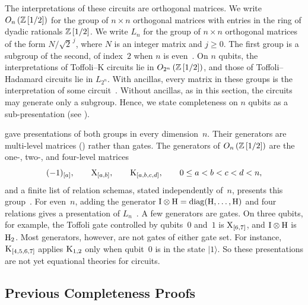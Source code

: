 \documentclass[acmsmall,screen,nonacm]{acmart}
\begin{document}
The interpretations of these circuits are orthogonal matrices. We write $O_n\left(\mathbb{Z}\left[1/2\right]\right)$ for the group of $n\times n$ orthogonal matrices with entries in the ring of dyadic rationals $\mathbb{Z}\left[1/2\right]$. We write $L_n$ for the group of $n\times n$ orthogonal matrices of the form $N/\sqrt2^{\,j}$, where $N$ is an integer matrix and $j\ge0$. The first group is a subgroup of the second, of index~$2$ when $n$ is even~\cite{li2021on}. On $n$ qubits, the interpretations of Toffoli--K circuits lie in $O_{2^n}\left(\mathbb{Z}\left[1/2\right]\right)$, and those of Toffoli--Hadamard circuits lie in $L_{2^n}$. With ancillas, every matrix in these groups is the interpretation of some circuit~\cite{amy2020numbertheoretic}. Without ancillas, as in this section, the circuits may generate only a subgroup. Hence, we state completeness on $n$ qubits as a sub-presentation (see ).

\citet{li2021on} gave presentations of both groups in every dimension~$n$. Their generators are multi-level matrices () rather than gates. The generators of $O_n\left(\mathbb{Z}\left[1/2\right]\right)$ are the one-, two-, and four-level matrices
\[
(-1)_{[a]}, \qquad \mathrm{X}_{[a,b]}, \qquad \mathrm{K}_{[a,b,c,d]}, \qquad 0\le a<b<c<d<n,
\]
and a finite list of relation schemas, stated independently of~$n$, presents this group~\cite[Theorem~4.10]{li2021on}. For even~$n$, adding the generator $\mathrm{I}\otimes\mathrm{H} = \mathrm{diag}(\mathrm{H},\dots,\mathrm{H})$ and four relations gives a presentation of $L_n$~\cite[Theorem~5.7]{li2021on}. A few generators are gates. On three qubits, for example, the Toffoli gate controlled by qubits~$0$ and~$1$ is $\mathrm{X}_{[6,7]}$, and $\mathrm{I}\otimes\mathrm{H}$ is $\mathrm{H}_2$. Most generators, however, are not gates of either gate set. For instance, $\mathrm{K}_{[4,5,6,7]}$ applies $\mathrm{K}_{1,2}$ only when qubit~$0$ is in the state $\lvert 1\rangle$. So these presentations are not yet equational theories for circuits.
\iffalse
\subsection{Previous Completeness Proofs}
\label{sec:previous-completeness}
\end{document}
